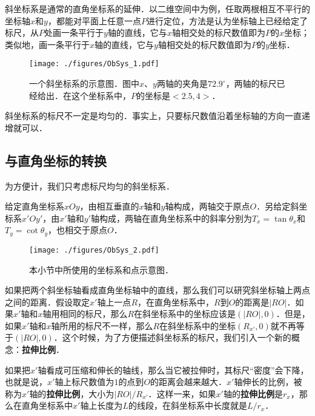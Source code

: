 
斜坐标系是通常的直角坐标系的延伸．以二维空间中为例，任取两根相互不平行的坐标轴$x$和$y$，都能对平面上任意一点$P$进行定位，方法是认为坐标轴上已经给定了标尺，从$P$处画一条平行于$y$轴的直线，它与$x$轴相交处的标尺数值即为$P$的$x$坐标；类似地，画一条平行于$x$轴的直线，它与$y$轴相交处的标尺数值即为$P$的$y$坐标．

\begin{figure}[ht]
\centering
\texttt{[image: ./figures/ObSys\_1.pdf]}
\caption{一个斜坐标系的示意图．图中$x$、$y$两轴的夹角是$72.9^\circ$，两轴的标尺已经给出．在这个坐标系中，$P$的坐标是$<2.5, 4>$．} \label{ObSys_fig1}
\end{figure}

斜坐标系的标尺不一定是均匀的．事实上，只要标尺数值沿着坐标轴的方向一直递增就可以．

\subsection{与直角坐标的转换}

为方便计，我们只考虑标尺均匀的斜坐标系．

给定直角坐标系$xOy$，由相互垂直的$x$轴和$y$轴构成，两轴交于原点$O$．另给定斜坐标系$x'Oy'$，由$x'$轴和$y'$轴构成，两轴在直角坐标系中的斜率分别为$T_x=\tan{\theta_x}$和$T_y=\cot{\theta_y}$，也相交于原点$O$．

\begin{figure}[ht]
\centering
\texttt{[image: ./figures/ObSys\_2.pdf]}
\caption{本小节中所使用的坐标系和点示意图．} \label{ObSys_fig2}
\end{figure}

如果把两个斜坐标轴看成直角坐标轴中的直线，那么我们可以研究斜坐标轴上两点之间的距离．假设取定$x'$轴上一点$R$，在直角坐标系中，$R$到$O$的距离是$|RO|$．如果$x'$轴和$x$轴用相同的标尺，那么$R$在斜坐标系中的坐标应该是$(|RO|, 0)$．但是，如果$x'$轴和$x$轴所用的标尺不一样，那么$R$在斜坐标系中的坐标$(R_{x'},0)$就不再等于$(|RO|, 0)$．这个时候，为了方便描述斜坐标系的标尺，我们引入一个新的概念：\textbf{拉伸比例}．

如果把$x'$轴看成可压缩和伸长的轴线，那么当它被拉伸时，其标尺“密度”会下降，也就是说，$x'$轴上标尺数值为$1$的点到$O$的距离会越来越大．$x'$轴伸长的比例，被称为$x'$轴的\textbf{拉伸比例}，大小为$|RO|/R_{x'}$．这样一来，如果$x'$轴的\textbf{拉伸比例}是$r_x$，那么在直角坐标系中$x'$轴上长度为$L$的线段，在斜坐标系中长度就是$L/r_x$．

